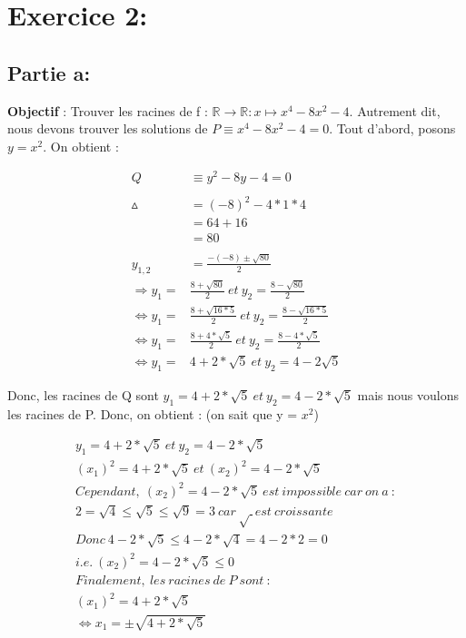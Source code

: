 \documentclass[a4paper, 12pt]{article}
\begin{document}
\newpage
\section{Exercice 2:}
\subsection{Partie a:}

\textbf{Objectif} : Trouver les racines de f : \( \mathbb{R} \rightarrow \mathbb{R} : x \mapsto x^4 - 8x^2 - 4 \).
Autrement dit, nous devons trouver les solutions de \( P \equiv x^4 - 8x^2 - 4 = 0 \). \newline
Tout d'abord, posons \( y = x^2 \).
On obtient : 

\begin{align*}
	Q &\equiv y^2 - 8y - 4 = 0\\ \\
	\vartriangle &= (-8)^2 - 4 * 1 * 4 \\
	       &= 64 + 16 \\
	       &= 80 \\ \\
   y_{1,2} &= \frac{-(-8) \pm \sqrt{80}}{2} \\
   \Rightarrow y_1 = &\frac{8 + \sqrt{80}}{2} ~ et ~ y_2 = \frac{8 - \sqrt{80}}{2} \\
   \Leftrightarrow y_1 = &\frac{8 + \sqrt{16 * 5}}{2} ~ et ~ y_2 = \frac{8 - \sqrt{16 * 5}}{2} \\
   \Leftrightarrow y_1 = &\frac{8 + 4 * \sqrt{5}}{2} ~ et ~ y_2 = \frac{8 - 4 * \sqrt{5}}{2} \\
    \Leftrightarrow y_1 = &4 + 2 * \sqrt{5} ~ et ~ y_2 = 4 - 2\sqrt{5}
\end{align*}


Donc, les racines de Q sont \( y_1 = 4 + 2 * \sqrt{5} ~ et ~ y_2 = 4 - 2 * \sqrt{5}  \) mais nous voulons les racines de P. Donc, on obtient : (on sait que y = $x^2$)


\begin{align*}
	y_1 = 4 + 2 * \sqrt{5} ~ et ~ y_2 = 4 - 2 * \sqrt{5} \\
	(x_1)^2 = 4 + 2 * \sqrt{5} ~ et ~ (x_2)^2 = 4 - 2 * \sqrt{5} \\
	Cependant, ~ (x_2)^2 = 4 - 2 * \sqrt{5} ~ est ~ impossible ~ car ~ on ~ a ~ : \\
	2 = \sqrt{4} \leq \sqrt{5} \leq \sqrt{9} = 3 ~ car ~ \surd ~ est ~ croissante \\
	Donc ~ 4 - 2 * \sqrt{5} \leq 4 - 2 * \sqrt{4} = 4 - 2 * 2 = 0 \\
	i.e. ~ (x_2)^2 = 4 - 2 * \sqrt{5} \leq 0 ~~~~~~~~~~~~~~~~~~~~~~~~~ \\
	Finalement, ~ les ~ racines ~ de ~ P ~ sont ~ : \\
	(x_1)^2 = 4 + 2 * \sqrt{5} \\
	\Leftrightarrow x_1 = \pm \sqrt{4 + 2 * \sqrt{5}}	
\end{align*}
\end{document}
